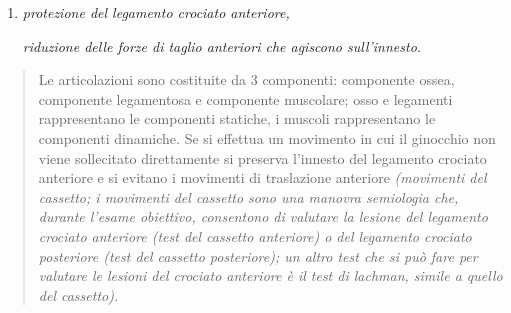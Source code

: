 \documentclass[]{article}
\begin{document}
\begin{enumerate}
\def\labelenumi{\arabic{enumi}.}
\item
  \emph{protezione del legamento crociato anteriore,}

  \emph{riduzione delle forze di taglio anteriori che agiscono
  sull'innesto.}
\end{enumerate}

\begin{quote}
Le articolazioni sono costituite da 3 componenti: componente ossea,
componente legamentosa e componente muscolare; osso e legamenti
rappresentano le componenti statiche, i muscoli rappresentano le
componenti dinamiche. Se si effettua un movimento in cui il ginocchio
non viene sollecitato direttamente si preserva l'innesto del legamento
crociato anteriore e si evitano i movimenti di traslazione anteriore
\emph{(movimenti del cassetto; i movimenti del cassetto sono una manovra
semiologia che, durante l'esame obiettivo, consentono di valutare la
lesione del legamento crociato anteriore (test del cassetto anteriore) o
del legamento crociato posteriore (test del cassetto posteriore); un
altro test che si può fare per valutare le lesioni del crociato
anteriore è il test di lachman, simile a quello del cassetto).}
\end{quote}
\end{document}
